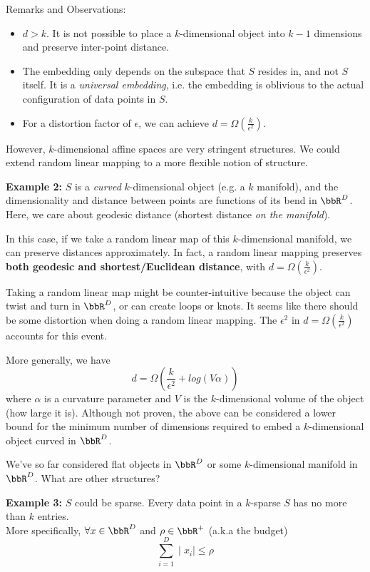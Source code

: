 \begin{itemize}
Remarks and Observations:
  \begin{itemize}
      \item $d > k$. It is not possible to place a $k$-dimensional object into $k-1$ dimensions and preserve inter-point distance. 
      \item The embedding only depends on the subspace that $S$ resides in, and not $S$ itself. It is a \textit{universal embedding}, i.e. the embedding is oblivious to the actual configuration of data points in $S$.
      \item For a distortion factor of $\epsilon$, we can achieve $d = \Omega(\frac{k}{\epsilon^2})$. 
  \end{itemize}

  
 However, $k$-dimensional affine spaces are very stringent structures. We could extend random linear mapping to a more flexible notion of structure. 


\indent
      \textbf{Example 2:} $S$ is a \textit{curved} $k$-dimensional object (e.g. a $k$ manifold), and the dimensionality and distance between points are functions of its bend in $\bbR^D$. Here, we care about geodesic distance (shortest distance \textit{on the manifold}). 


 In this case, if we take a random linear map of this $k$-dimensional manifold, 
we can preserve distances approximately. In fact, a random linear mapping 
preserves \textbf{both geodesic and shortest/Euclidean distance}, 
with $d = \Omega(\frac{k}{\epsilon^2})$. 


 Taking a random linear map might be counter-intuitive because the object can 
 twist and turn in $\bbR^D$, or can create loops or knots. It seems like there
 should be some distortion when doing a random linear mapping. The $\epsilon^2$
  in $d = \Omega(\frac{k}{\epsilon^2})$ accounts for this event. 


 More generally, we have
 $$ d = \Omega(\frac{k}{\epsilon^2} + log(V\alpha))$$
 where $\alpha$ is a curvature parameter and $V$ is the $k$-dimensional volume 
 of the object (how large it is). Although not proven, the above can be 
 considered a lower bound for the minimum number of dimensions required to 
 embed a $k$-dimensional object curved in $\bbR^D$. 


 We've so far considered flat objects in $\bbR^D$ or some $k$-dimensional manifold in $\bbR^D$. What are other structures? 


\indent
      \textbf{Example 3:} $S$ could be sparse. Every data point in a $k$-sparse $S$ has no more than $k$ entries. \\
      More specifically, $\forall x \in \bbR^D$ and $\rho \in \bbR^+$ (a.k.a the budget) $$ \sum\limits_{i =1}^{D} \mid x_i \mid \leq \rho$$



\end{itemize}
